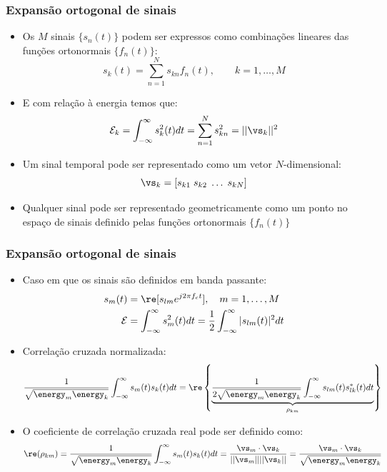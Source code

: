 \begin{frame}
	\frametitle{Expansão ortogonal de sinais}

	\begin{itemize}
	  \item Os $M$ sinais $\{ s_n(t) \}$ podem ser expressos como combinações lineares das funções ortonormais $\{ f_n(t) \}$:
	  \begin{equation*}
		s_k(t) = \sum_{n=1}^{N} s_{kn} f_n(t) , \qquad k=1,\ldots,M 
	  \end{equation*}
	  \item E com relação à energia temos que:
	  \begin{equation*}
	       \mathcal{E}_k = \int_{-\infty}^{\infty} s_k^2(t) dt = \sum_{n=1}^{N} s_{kn}^2 = || \vs_k ||^2
	  \end{equation*}
	  \item Um sinal temporal pode ser representado como um vetor $N$-dimensional:
	  \begin{equation*}
		\vs_k = [ s_{k1} \; s_{k2} \; \ldots \; s_{kN} ]
	  \end{equation*}
	  \item Qualquer sinal pode ser representado geometricamente como um ponto no espaço de sinais definido pelas funções ortonormais $\{ f_n(t) \}$
	\end{itemize}

\end{frame}

\begin{frame}
	\frametitle{Expansão ortogonal de sinais}

	\begin{itemize}
	  \item Caso em que os sinais são definidos em banda passante:
	  \begin{align*}
	      s_m(t) &= \re[s_{lm} e^{j2\pi f_c t}] , \quad m=1,\ldots,M \\
	      \mathcal{E} &= \int_{-\infty}^{\infty} s_m^2(t) dt = \frac{1}{2} \int_{-\infty}^{\infty} |s_{lm}(t)|^2 dt
	  \end{align*}
	  \item Correlação cruzada normalizada:
	   \begin{equation*}
		\frac{1}{\sqrt{\energy_m\energy_k}} \int_{-\infty}^{\infty} s_m(t) s_k(t) dt = \re\left\{ \underbrace{\frac{1}{2\sqrt{\energy_m\energy_k}} \int_{-\infty}^{\infty} s_{lm}(t) s_{lk}^*(t) dt}_{\rho_{km}} \right\}
	   \end{equation*}
	  \item O coeficiente de correlação cruzada real pode ser definido como:
	  \begin{equation*}
		\re(\rho_{km}) = \frac{1}{\sqrt{\energy_m\energy_k}} \int_{-\infty}^{\infty} s_m(t) s_k(t) dt = \frac{\vs_m \cdot \vs_k}{||\vs_m|| ||\vs_k||} = \frac{\vs_m \cdot \vs_k}{\sqrt{\energy_m\energy_k}}
	  \end{equation*}

	\end{itemize}

\end{frame}

